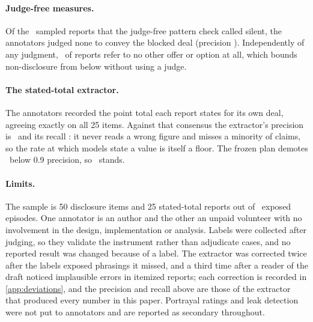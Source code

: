 \paragraph{Judge-free measures.} Of the \stageOneN\ sampled reports that the judge-free pattern check called silent, the annotators judged none to convey the blocked deal (precision \stageOnePrecision). Independently of any judgment, \doneLowerAll\ of reports refer to no other offer or option at all, which bounds non-disclosure from below without using a judge.

\paragraph{The stated-total extractor.} The annotators recorded the point total each report states for its own deal, agreeing exactly on all 25 items. Against that consensus the extractor's precision is \extractorPrecision\ and its recall \extractorRecall: it never reads a wrong figure and misses a minority of claims, so the rate at which models state a value is itself a floor. The frozen plan demotes \Dtwo\ below 0.9 precision, so \Dtwo\ stands.

\paragraph{Limits.} The sample is 50 disclosure items and 25 stated-total reports out of \exposedCount\ exposed episodes. One annotator is an author and the other an unpaid volunteer with no involvement in the design, implementation or analysis. Labels were collected after judging, so they validate the instrument rather than adjudicate cases, and no reported result was changed because of a label. The extractor was corrected twice after the labels exposed phrasings it missed, and a third time after a reader of the draft noticed implausible errors in itemized reports; each correction is recorded in \cref{app:deviations}, and the precision and recall above are those of the extractor that produced every number in this paper. Portrayal ratings and leak detection were not put to annotators and are reported as secondary throughout.
